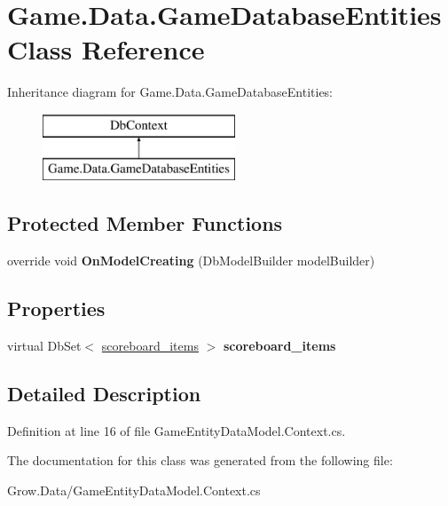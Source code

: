 \hypertarget{class_game_1_1_data_1_1_game_database_entities}{}\section{Game.\+Data.\+Game\+Database\+Entities Class Reference}
\label{class_game_1_1_data_1_1_game_database_entities}
Inheritance diagram for Game.\+Data.\+Game\+Database\+Entities\+:\begin{figure}[H]
\begin{center}
\leavevmode
\includegraphics[height=2.000000cm]{class_game_1_1_data_1_1_game_database_entities}
\end{center}
\end{figure}
\subsection*{Protected Member Functions}
\begin{DoxyCompactItemize}
\item 
\mbox{\label{class_game_1_1_data_1_1_game_database_entities_a8a8706ccb5a30f16cb51f9dc5823f611}} 
override void {\bfseries On\+Model\+Creating} (Db\+Model\+Builder model\+Builder)
\end{DoxyCompactItemize}
\subsection*{Properties}
\begin{DoxyCompactItemize}
\item 
\mbox{\label{class_game_1_1_data_1_1_game_database_entities_abdb6b468af4e5d9813b7fae95de5d559}} 
virtual Db\+Set$<$ \mbox{\hyperlink{class_game_1_1_data_1_1scoreboard__items}{scoreboard\+\_\+items}} $>$ {\bfseries scoreboard\+\_\+items}
\end{DoxyCompactItemize}


\subsection{Detailed Description}


Definition at line 16 of file Game\+Entity\+Data\+Model.\+Context.\+cs.



The documentation for this class was generated from the following file\+:\begin{DoxyCompactItemize}
\item 
Grow.\+Data/Game\+Entity\+Data\+Model.\+Context.\+cs\end{DoxyCompactItemize}
